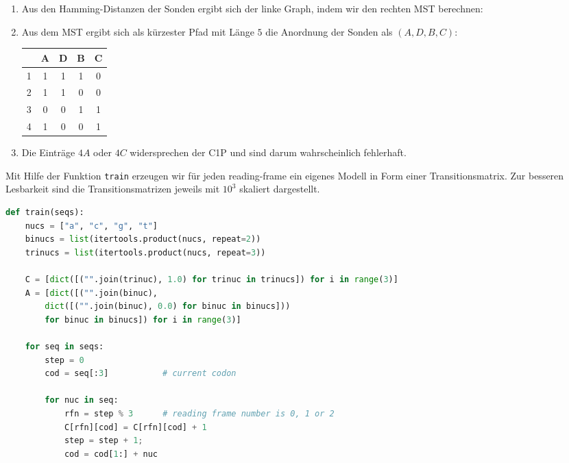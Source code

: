 \documentclass{homework}
\begin{document}
\begin{enumerate}
\begin{enumerate}

\item Aus den Hamming-Distanzen der Sonden ergibt sich der linke Graph, indem wir den rechten MST berechnen:

\newpage


\item Aus dem MST ergibt sich als kürzester Pfad mit Länge $5$ die Anordnung der Sonden als $(A,D,B,C)$:

\begin{tabular}{l|cccc}
	& A	& D	& B	& C\\\hline
1	& 1	& 1	& 1	& 0\\
2	& 1	& 1	& 0	& 0\\
3	& 0	& 0	& 1	& 1\\
4	& 1	& 0	& 0	& 1
\end{tabular}

\item Die Einträge $4A$ oder $4C$ widersprechen der C1P und sind darum wahrscheinlich fehlerhaft.

\end{enumerate}


Mit Hilfe der Funktion \texttt{train} erzeugen wir für jeden reading-frame ein eigenes Modell in Form einer Transitionsmatrix.
Zur besseren Lesbarkeit sind die Transitionsmatrizen jeweils mit $10^3$ skaliert dargestellt.

\begin{lstlisting}[language=python]
def train(seqs):
	nucs = ["a", "c", "g", "t"]
	binucs = list(itertools.product(nucs, repeat=2))
	trinucs = list(itertools.product(nucs, repeat=3))

	C = [dict([("".join(trinuc), 1.0) for trinuc in trinucs]) for i in range(3)]
	A = [dict([("".join(binuc),
		dict([("".join(binuc), 0.0) for binuc in binucs]))
		for binuc in binucs]) for i in range(3)]

	for seq in seqs:
		step = 0
		cod = seq[:3]			# current codon

		for nuc in seq:
			rfn = step % 3		# reading frame number is 0, 1 or 2
			C[rfn][cod] = C[rfn][cod] + 1
			step = step + 1;
			cod = cod[1:] + nuc


\end{lstlisting}
\end{enumerate}
\end{document}

